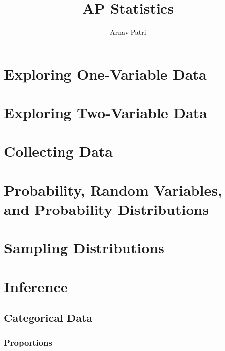 \documentclass[12pt, A4]{report}
\title{AP Statistics}
\author{Arnav Patri}
\begin{document}
	\maketitle
	\tableofcontents
	\part{Exploring One-Variable Data}
		
	\part{Exploring Two-Variable Data}
		
	\part{Collecting Data}
		
	\part{Probability, Random Variables, and Probability Distributions}
		
	\part{Sampling Distributions}
		
	\part{Inference}
		\chapter{Categorical Data}
			\section{Proportions}
				
\end{document}
